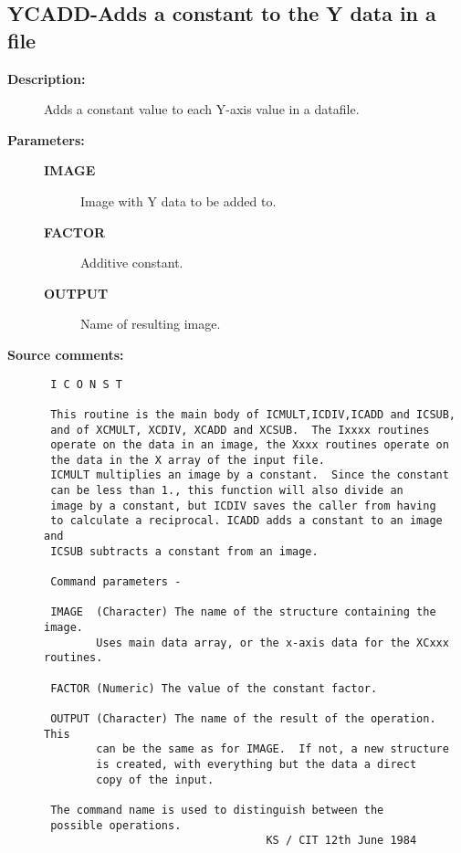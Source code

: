 \subsection{YCADD-\label{YCADD}Adds a constant to the Y data in a file}
\begin{description}

\item [{\bf Description:}]
 Adds a constant value to each Y-axis value in a datafile.

\item [{\bf Parameters:}]
\begin{description}
\item [{\bf IMAGE}]
 Image with Y data to be added to.
\item [{\bf FACTOR}]
 Additive constant.
\item [{\bf OUTPUT}]
 Name of resulting image.
\end{description}

\item [{\bf Source comments:}]
\begin{verbatim}
 I C O N S T

 This routine is the main body of ICMULT,ICDIV,ICADD and ICSUB,
 and of XCMULT, XCDIV, XCADD and XCSUB.  The Ixxxx routines
 operate on the data in an image, the Xxxx routines operate on
 the data in the X array of the input file.
 ICMULT multiplies an image by a constant.  Since the constant
 can be less than 1., this function will also divide an
 image by a constant, but ICDIV saves the caller from having
 to calculate a reciprocal. ICADD adds a constant to an image and
 ICSUB subtracts a constant from an image.

 Command parameters -

 IMAGE  (Character) The name of the structure containing the image.
        Uses main data array, or the x-axis data for the XCxxx routines.

 FACTOR (Numeric) The value of the constant factor.

 OUTPUT (Character) The name of the result of the operation.  This
        can be the same as for IMAGE.  If not, a new structure
        is created, with everything but the data a direct
        copy of the input.

 The command name is used to distinguish between the
 possible operations.
                                  KS / CIT 12th June 1984
\end{verbatim}
\end{description}
